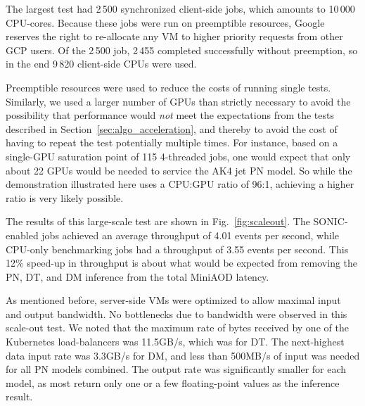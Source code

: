 The largest test had 2\,500 synchronized client-side jobs, which amounts to 10\,000 CPU-cores. Because these jobs were run on preemptible resources, Google reserves the right to re-allocate any VM to higher priority requests from other GCP users. Of the 2\,500 job, 2\,455 completed successfully without preemption, so in the end 9\,820 client-side CPUs were used.

Preemptible resources were used to reduce the costs of running single tests. Similarly, we used a larger number of GPUs than strictly necessary to avoid the possibility that performance would \textit{not} meet the expectations from the tests described in Section~\ref{sec:algo_acceleration}, and thereby to avoid the cost of having to repeat the test potentially multiple times. For instance, based on a single-GPU saturation point of 115 4-threaded jobs, one would expect that only about 22 GPUs would be needed to service the AK4 jet PN model. So while the demonstration illustrated here uses a CPU:GPU ratio of 96:1, achieving a higher ratio is very likely possible.

The results of this large-scale test are shown in Fig.~\ref{fig:scaleout}. The SONIC-enabled jobs achieved an average throughput of 4.01 events per second, while CPU-only benchmarking jobs had a throughput of 3.55 events per second. This 12\% speed-up in throughput is about what would be expected from removing the PN, DT, and DM inference from the total MiniAOD latency.

\begin{sloppypar}As mentioned before, server-side VMs were optimized to allow maximal input and output bandwidth. No bottlenecks due to bandwidth were observed in this scale-out test. We noted that the maximum rate of bytes received by one of the Kubernetes load-balancers was 11.5\unit{GB/s}, which was for DT. The next-highest data input rate was 3.3\unit{GB/s} for DM, and less than 500\unit{MB/s} of input was needed for all PN models combined. The output rate was significantly smaller for each model, as most return only one or a few floating-point values as the inference result.\end{sloppypar}



